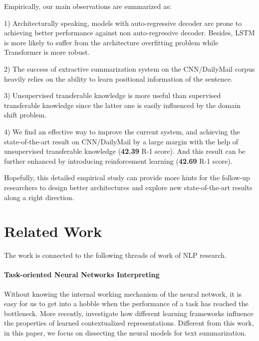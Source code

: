 \documentclass[11pt,a4paper]{article}
\begin{document}
Empirically, our main observations are summarized as:

1) Architecturally speaking, models with auto-regressive decoder are prone to achieving better performance against non auto-regressive decoder. Besides, LSTM is more likely to suffer from the architecture overfitting problem while Transformer is more robust.

    2) The success of extractive summarization system on the CNN/DailyMail corpus heavily relies on the ability to learn positional information of the sentence.

    3) Unsupervised transferable knowledge is more useful than supervised transferable knowledge since the latter one is easily influenced by the domain shift problem.

    4) We find an effective way to improve the current system, and achieving the state-of-the-art result on CNN/DailyMail by a large margin with the help of unsupervised transferable knowledge (\textbf{42.39} R-1 score). And this result can be further enhanced by introducing reinforcement learning (\textbf{42.69} R-1 score).
   





Hopefully, this detailed empirical study can provide more hints for the follow-up researchers to design better architectures and explore new state-of-the-art results along a right direction.








\section{Related Work}
The work is connected to the following threads of work of NLP research.



\paragraph{Task-oriented Neural Networks Interpreting}


Without knowing the internal working mechanism of the neural network, it is easy for us to get into a hobble when the performance of a task has reached the bottleneck.
 More recently, \citet{peters2018dissecting} investigate how different learning frameworks influence the properties of learned contextualized representations.
 Different from this work, in this paper, we focus on dissecting the neural models for text summarization.
\end{document}
